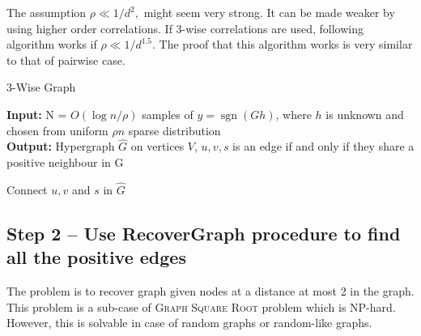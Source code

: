 \documentclass[11pt]{article}
\newcommand{\sgn}{\operatorname{sgn}}
\begin{document}
	The assumption $\rho \ll 1/d^2,$ might seem very strong. It can be made weaker by using higher order correlations. If 3-wise correlations are used, following algorithm works if $\rho \ll 1/d^{1.5}$. The proof that this algorithm works is very similar to that of pairwise case.

	\begin{algorithm}
		\caption{3-Wise Graph}
		\label{algo:3-corr}
		\textbf{Input:} N = $O(\log n/\rho)$ samples of $y = \sgn(Gh)$, where $h$ is unknown and chosen from uniform $\rho n$ sparse distribution\\
		\textbf{Output:} Hypergraph $\hat{G}$ on vertices $V$, $u,v,s$ is an edge if and only if they share a positive neighbour in G
		\begin{algorithmic}[1]
			\STATE Connect $u,v$ and $s$ in $\hat{G}$
			\ENDIF
			\ENDFOR
		\end{algorithmic}
	\end{algorithm}


	\subsection{Step 2 -- Use \textmd{RecoverGraph} procedure to find all the positive edges}
	The problem is to recover graph given nodes at a distance at most 2 in the graph. This problem is a sub-case of \textsc{Graph Square Root} problem which is NP-hard. However, this is solvable in case of random graphs or random-like graphs.
\end{document}
